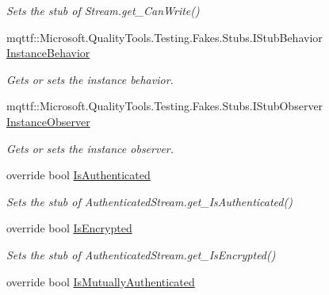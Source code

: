 \begin{DoxyCompactItemize}
\begin{DoxyCompactList}\small\item\em Sets the stub of Stream.\-get\-\_\-\-Can\-Write()\end{DoxyCompactList}\item 
mqttf\-::\-Microsoft.\-Quality\-Tools.\-Testing.\-Fakes.\-Stubs.\-I\-Stub\-Behavior \hyperlink{class_system_1_1_net_1_1_security_1_1_fakes_1_1_stub_authenticated_stream_ac71a3f8924e496d50ff2658c83dca6b4}{Instance\-Behavior}
\begin{DoxyCompactList}\small\item\em Gets or sets the instance behavior.\end{DoxyCompactList}\item 
mqttf\-::\-Microsoft.\-Quality\-Tools.\-Testing.\-Fakes.\-Stubs.\-I\-Stub\-Observer \hyperlink{class_system_1_1_net_1_1_security_1_1_fakes_1_1_stub_authenticated_stream_a2c664e639156987c171f5aafa33bc310}{Instance\-Observer}
\begin{DoxyCompactList}\small\item\em Gets or sets the instance observer.\end{DoxyCompactList}\item 
override bool \hyperlink{class_system_1_1_net_1_1_security_1_1_fakes_1_1_stub_authenticated_stream_a97121f8b441b90a46b80ab78bf0ca9f2}{Is\-Authenticated}
\begin{DoxyCompactList}\small\item\em Sets the stub of Authenticated\-Stream.\-get\-\_\-\-Is\-Authenticated()\end{DoxyCompactList}\item 
override bool \hyperlink{class_system_1_1_net_1_1_security_1_1_fakes_1_1_stub_authenticated_stream_a0818e79738b753e3b77c871c5498418c}{Is\-Encrypted}
\begin{DoxyCompactList}\small\item\em Sets the stub of Authenticated\-Stream.\-get\-\_\-\-Is\-Encrypted()\end{DoxyCompactList}\item 
override bool \hyperlink{class_system_1_1_net_1_1_security_1_1_fakes_1_1_stub_authenticated_stream_a90ff06562f9f821fc411c1542b85c3d7}{Is\-Mutually\-Authenticated}

\end{DoxyCompactItemize}
